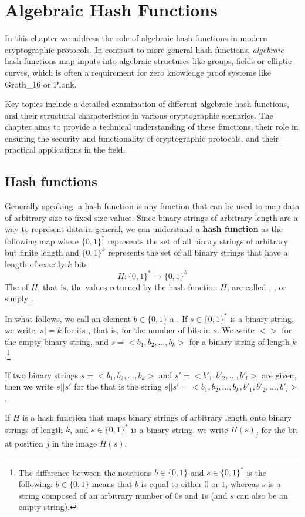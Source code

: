 \chapter{Algebraic Hash Functions}\label{chap:hash}
In this chapter we address the role of algebraic hash functions in modern cryptographic protocols. In contrast to more general hash functions, \textit{algebraic} hash functions map inputs into algebraic structures like groups, fields or elliptic curves, which is often a requirement for zero knowledge proof systems like Groth\_16 or Plonk.

Key topics include a detailed examination of different algebraic hash functions, and their structural characteristics in various cryptographic scenarios. The chapter aims to provide a technical understanding of these functions, their role in ensuring the security and functionality of cryptographic protocols, and their practical applications in the field.

\section{Hash functions}\label{sec:hash-functions} Generally speaking, a hash function is any function that can be used to map data of arbitrary size to fixed-size values. Since binary strings of arbitrary length are a way to represent data in general, we can understand a \textbf{hash function} as the following map where $\{0,1\}^*$ represents the set of all binary strings of arbitrary but finite length and $\{0,1\}^k$ represents the set of all binary strings that have a length of exactly $k$ bits:
\begin{equation}
\label{def:hash_function}
H: \{0,1\}^* \to \{0,1\}^k
\end{equation}
The  of $H$, that is, the values returned by the hash function $H$, are called , , or simply .

\begin{notation}
\label{string_and_hash_notations}
In what follows, we call an element $b\in\{0,1\}$ a . If $s\in\{0,1\}^*$ is a binary string, we write $|s|=k$ for its , that is, for the number of bits in $s$. We write $<>$ for the empty binary string, and $s=<b_1,b_2,\ldots,b_k>$ for a binary string of length $k$.\footnote{The difference between the notations $b\in\{0,1\}$ and $s\in\{0,1\}^*$ is the following: $b\in\{0,1\}$ means that $b$ is equal to either $0$ or $1$, whereas $s$ is a string composed of an arbitrary number of $0$s and $1$s (and $s$ can also be an empty string).}

If two binary strings $s=<b_1,b_2,\ldots,b_k>$ and $s'=<b'_1,b'_2,\ldots,b'_l>$ are given, then we write $s||s'$ for the  that is the string 
$s||s'=<b_1,b_2,\ldots,b_k,b'_1,b'_2,\ldots,b'_l>$.

If $H$ is a hash function that maps binary strings of arbitrary length onto binary strings of length $k$, and $s\in\{0,1\}^*$ is a binary string, we write $H(s)_j$ for the bit at position $j$ in the image $H(s)$.
\end{notation}

